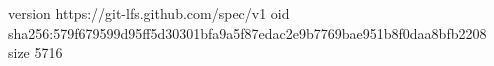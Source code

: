 version https://git-lfs.github.com/spec/v1
oid sha256:579f679599d95ff5d30301bfa9a5f87edac2e9b7769bae951b8f0daa8bfb2208
size 5716
